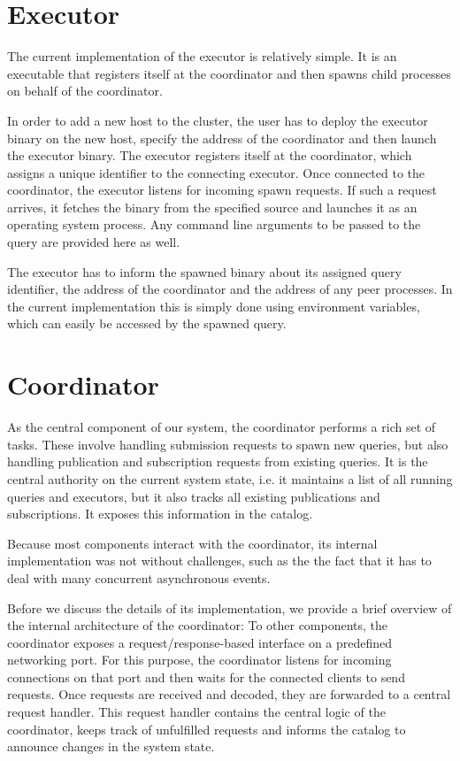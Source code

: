 \section{Executor}

The current implementation of the executor is relatively simple. It is an executable
that registers itself at the coordinator and then spawns child processes on behalf
of the coordinator.

In order to add a new host to the cluster, the user has to deploy the executor
binary on the new host, specify the address of the coordinator and then launch
the executor binary. The executor registers itself at the coordinator, which
assigns a unique identifier to the connecting executor. Once connected to the
coordinator, the executor listens for incoming spawn requests. If such a
request arrives, it fetches the binary from the specified source and launches
it as an operating system process. Any command line arguments to be passed
to the query are provided here as well.

The executor has to inform the spawned binary about its assigned query identifier,
the address of the coordinator and the address of any peer processes. In the
current implementation this is simply done using environment variables, which
can easily be accessed by the spawned query.



\section{Coordinator}

As the central component of our system, the coordinator performs a rich
set of tasks. These involve handling submission requests to spawn new queries,
but also handling publication and subscription requests from existing queries.
It is the central authority on the current system state, i.e. it maintains
a list of all running queries and executors, but it also tracks all existing
publications and subscriptions. It exposes this information in the catalog.

Because most components interact with the coordinator, its
internal implementation was not without challenges, such as the
the fact that it has to deal with many concurrent asynchronous events.

Before we discuss the details of its implementation, we provide a
brief overview of the internal architecture of the coordinator: To other
components, the coordinator exposes a request/response-based interface on a
predefined networking port. For this purpose, the coordinator listens for
incoming connections on that port and then waits for the connected clients
to send requests. Once requests are received and decoded, they are forwarded
to a central request handler. This request handler contains the central logic
of the coordinator, keeps track of unfulfilled requests and informs the
catalog to announce changes in the system state.


